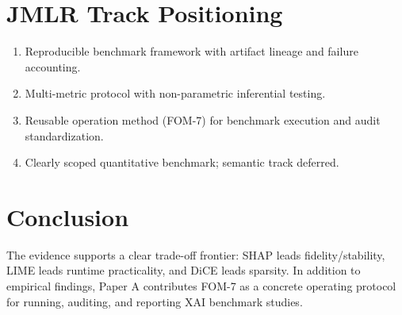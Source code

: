 \documentclass[twoside,11pt]{article}
\begin{document}
\section{JMLR Track Positioning}
\begin{enumerate}[leftmargin=*]
    \item Reproducible benchmark framework with artifact lineage and failure accounting.
    \item Multi-metric protocol with non-parametric inferential testing.
    \item Reusable operation method (FOM-7) for benchmark execution and audit standardization.
    \item Clearly scoped quantitative benchmark; semantic track deferred.
\end{enumerate}

\section{Conclusion}
The evidence supports a clear trade-off frontier: SHAP leads fidelity/stability, LIME leads runtime practicality, and DiCE leads sparsity. In addition to empirical findings, Paper A contributes FOM-7 as a concrete operating protocol for running, auditing, and reporting XAI benchmark studies.

\end{document}
